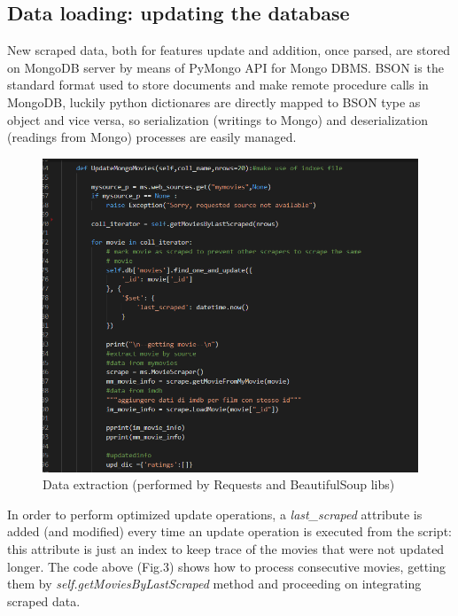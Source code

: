 \documentclass[11pt]{article}
\begin{document}
\subsection{Data loading: updating the database}
New scraped data, both for features update and addition, once parsed, are stored on MongoDB server by means of PyMongo API for Mongo DBMS. BSON is the standard format used to store documents and make remote procedure calls in MongoDB, luckily python dictionares are directly mapped to BSON type as object and vice versa, so serialization (writings to Mongo) and deserialization (readings from Mongo) processes are easily managed.
\begin{figure}[H]
    \centering
        \includegraphics[width=1.0\textwidth]{figures/codepic/f31.png}
    \caption{Data extraction (performed by Requests and BeautifulSoup libs)}
    \label{fig:1}
\end{figure}
\noindent In order to perform optimized update operations, a \emph{last\_scraped} attribute is added (and modified) every time an update operation is executed from the script: this attribute is just an index to keep trace of the movies that were not updated longer. The code above (Fig.3) shows how to process consecutive movies, getting them by \emph{self.getMoviesByLastScraped} method and proceeding on integrating scraped data.
\newpage
\end{document}
